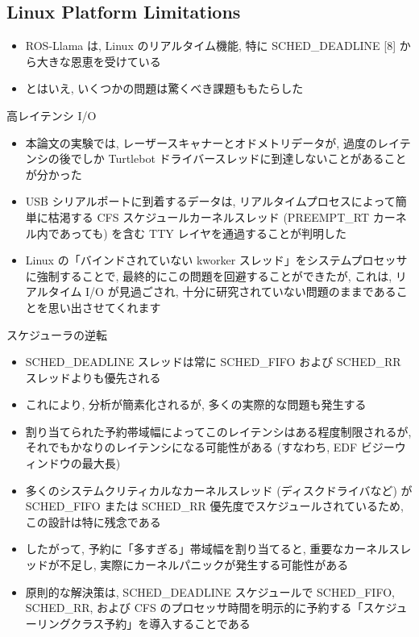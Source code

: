 \subsection{Linux Platform Limitations}
\label{ssec: linux platform limitations}

\begin{frame}{}
    \begin{itemize}
        \item ROS-Llama は, Linux のリアルタイム機能, 特に SCHED\_DEADLINE [8] から大きな恩恵を受けている
\item とはいえ, いくつかの問題は驚くべき課題ももたらした
    \end{itemize}
\end{frame}

\begin{frame}{高レイテンシ I/O}
    \begin{itemize}
        \item 本論文の実験では, レーザースキャナーとオドメトリデータが, 過度のレイテンシの後でしか Turtlebot ドライバースレッドに到達しないことがあることが分かった
\item USB シリアルポートに到着するデータは, リアルタイムプロセスによって簡単に枯渇する CFS スケジュールカーネルスレッド (PREEMPT\_RT カーネル内であっても) を含む TTY レイヤを通過することが判明した
\item Linux の「バインドされていない kworker スレッド」をシステムプロセッサに強制することで, 最終的にこの問題を回避することができたが, これは, リアルタイム I/O が見過ごされ, 十分に研究されていない問題のままであることを思い出させてくれます
    \end{itemize}
\end{frame}

\begin{frame}{スケジューラの逆転}
    \begin{itemize}
        \item SCHED\_DEADLINE スレッドは常に SCHED\_FIFO および SCHED\_RR スレッドよりも優先される
\item これにより, 分析が簡素化されるが, 多くの実際的な問題も発生する
\item 割り当てられた予約帯域幅によってこのレイテンシはある程度制限されるが, それでもかなりのレイテンシになる可能性がある (すなわち, EDF ビジーウィンドウの最大長)
\item 多くのシステムクリティカルなカーネルスレッド (ディスクドライバなど) が SCHED\_FIFO または SCHED\_RR 優先度でスケジュールされているため, この設計は特に残念である
\item したがって, 予約に「多すぎる」帯域幅を割り当てると, 重要なカーネルスレッドが不足し, 実際にカーネルパニックが発生する可能性がある
\item 原則的な解決策は, SCHED\_DEADLINE スケジュールで SCHED\_FIFO, SCHED\_RR, および CFS のプロセッサ時間を明示的に予約する「スケジューリングクラス予約」を導入することである
    \end{itemize}
\end{frame}


